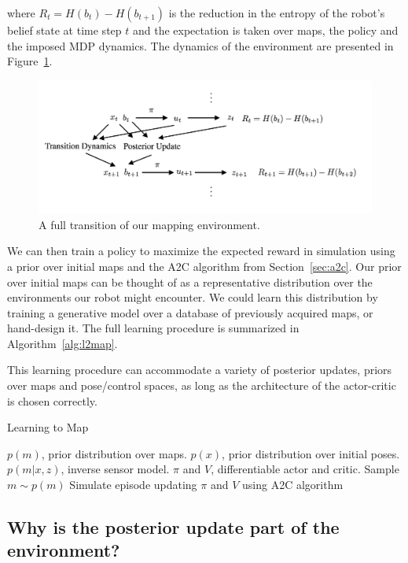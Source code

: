 \documentclass{article}
\begin{document}
where $R_t=H(b_t) - H(b_{t+1})$ is the reduction in the entropy of the robot's belief state at time step $t$ and the expectation is taken over maps, the policy and the imposed MDP dynamics. The dynamics of the environment are presented in Figure~\ref{fig:dynamics}.

\begin{figure}[h]
    \centering
    \label{fig:dynamics}
    \caption{A full transition of our mapping environment.}
    \medskip
    \includegraphics[scale=.4]{figs/dynamics.png}
\end{figure}

We can then train a policy to maximize the expected reward in simulation using a prior over initial maps and the A2C algorithm from Section~\ref{sec:a2c}. Our prior over initial maps can be thought of as a representative distribution over the environments our robot might encounter. We could learn this distribution by training a generative model over a database of previously acquired maps, or hand-design it. The full learning procedure is summarized in Algorithm~\ref{alg:l2map}.

This learning procedure can accommodate a variety of posterior updates, priors over maps and pose/control spaces, as long as the architecture of the actor-critic is chosen correctly.

\begin{algorithm}[b!]
  \caption{Learning to Map}
  \label{alg:l2map}
  \begin{algorithmic}[1]
    \Require $p(m)$, prior distribution over maps. $p(x)$, prior distribution over initial poses. $p(m|x, z)$, inverse sensor model. $\pi$ and $V$, differentiable actor and critic.
    \State Sample $m \sim p(m)$
    \State Simulate episode updating $\pi$ and $V$ using A2C algorithm 
    \EndFor
\end{algorithmic}
\end{algorithm}

\subsection{Why is the posterior update part of the environment?}
\end{document}
